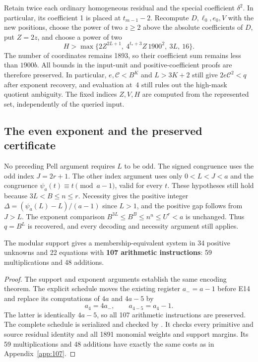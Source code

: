 Retain twice each ordinary homogeneous residual and the special
coefficient $\delta^2$. In particular, its coefficient 1 is placed at
$t_{m-1}-2$. Recompute $D,\ell_0,e_0,V$ with the new positions, choose
the power of two $z\ge2$ above the absolute coefficients of $D$, put
$Z=2z$, and choose a power of two
\[
 H>\max\{2Z^{2L+1},\ 4^{t_*+3}Z\,1900^2,\ 3L,\ 16\}.
\]
The number of coordinates remains 1893, so their coefficient sum remains
less than $1900b$. All bounds in the input-unit and positive-coefficient
proofs are therefore preserved. In particular, $e,\mathcal C<B^K$ and
$L>3K+2$ still give $2e\mathcal C^2<q$ after exponent recovery, and
evaluation at~4 still rules out the high-mask quotient ambiguity.
The fixed indices $Z,V,H$ are computed from the represented set,
independently of the queried input.

\subsection{The even exponent and the preserved certificate}

No preceding Pell argument requires $L$ to be odd. The signed congruence
uses the odd index $J=2r+1$. The other index argument uses only
$0<L<J<a$ and the congruence $\psi_a(t)\equiv t\pmod{a-1}$, valid for
every $t$. These hypotheses still hold because $3L<B\le n\le r$.
Necessity gives the positive integer
$\Delta=(\psi_a(L)-L)/(a-1)$ since $L>1$, and the positive gap follows
from $J>L$. The exponent comparison
$B^{3L}\le B^B\le n^n\le U^r<a$ is unchanged. Thus $q=B^L$ is
recovered, and every decoding and necessity argument still applies.

\begin{theorem}\label{thm:modular107}
The modular support gives a membership-equivalent system in 34 positive
unknowns and 22 equations with \textbf{107 arithmetic instructions}:
59 multiplications and 48 additions.
\end{theorem}

\begin{proof}
The support and exponent arguments establish the same encoding theorem.
The explicit schedule moves the existing register $a_-=a-1$ before E14 and
replace its computations of $4a$ and $4a-5$ by
\[
 a_4=4a_-,\qquad a_{4-5}=a_4-1.
\]
The latter is identically $4a-5$, so all 107 arithmetic instructions
are preserved. The complete schedule is serialized and checked by
. It checks every primitive and
source residual identity and all 1891 monomial weights and support
margins. Its 59 multiplications and 48 additions have exactly the
same costs as in Appendix~\ref{app:107}.
\end{proof}
